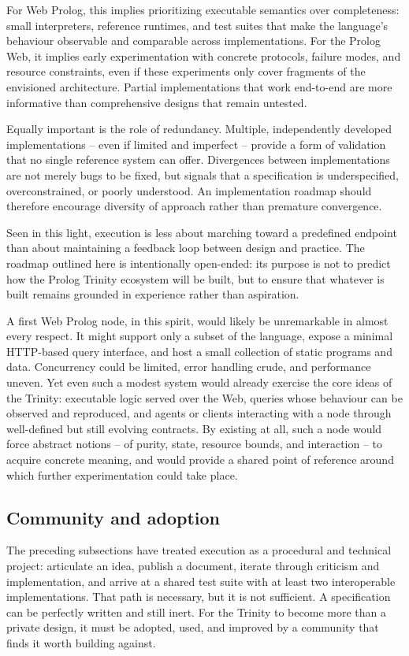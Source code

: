 For Web Prolog, this implies prioritizing executable semantics over completeness: small interpreters, reference runtimes, and test suites that make the language's behaviour observable and comparable across implementations. For the Prolog Web, it implies early experimentation with concrete protocols, failure modes, and resource constraints, even if these experiments only cover fragments of the envisioned architecture. Partial implementations that work end-to-end are more informative than comprehensive designs that remain untested.

Equally important is the role of redundancy. Multiple, independently developed implementations -- even if limited and imperfect -- provide a form of validation that no single reference system can offer. Divergences between implementations are not merely bugs to be fixed, but signals that a specification is underspecified, overconstrained, or poorly understood. An implementation roadmap should therefore encourage diversity of approach rather than premature convergence.

Seen in this light, execution is less about marching toward a predefined endpoint than about maintaining a feedback loop between design and practice. The roadmap outlined here is intentionally open-ended: its purpose is not to predict how the Prolog Trinity ecosystem will be built, but to ensure that whatever is built remains grounded in experience rather than aspiration.

A first Web Prolog node, in this spirit, would likely be unremarkable in almost every respect. It might support only a subset of the language, expose a minimal HTTP-based query interface, and host a small collection of static programs and data. Concurrency could be limited, error handling crude, and performance uneven. Yet even such a modest system would already exercise the core ideas of the Trinity: executable logic served over the Web, queries whose behaviour can be observed and reproduced, and agents or clients interacting with a node through well-defined but still evolving contracts. By existing at all, such a node would force abstract notions -- of purity, state, resource bounds, and interaction -- to acquire concrete meaning, and would provide a shared point of reference around which further experimentation could take place.


\subsection{Community and adoption}\label{sec:execution-community}
The preceding subsections have treated execution as a procedural and technical project: articulate an idea, publish a document, iterate through criticism and implementation, and arrive at a shared test suite with at least two interoperable implementations. That path is necessary, but it is not sufficient. A specification can be perfectly written and still inert. For the Trinity to become more than a private design, it must be adopted, used, and improved by a community that finds it worth building against.

